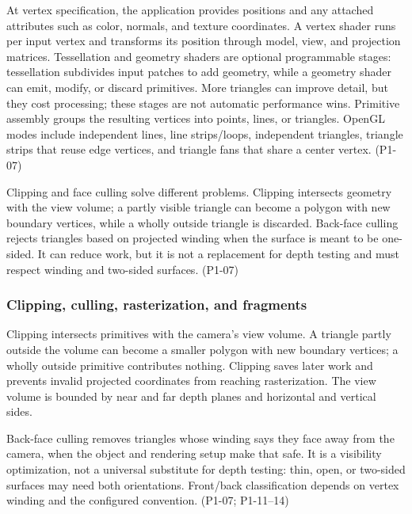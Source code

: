 At vertex specification, the application provides positions and any attached attributes such as color, normals, and texture coordinates. A vertex shader runs per input vertex and transforms its position through model, view, and projection matrices. Tessellation and geometry shaders are optional programmable stages: tessellation subdivides input patches to add geometry, while a geometry shader can emit, modify, or discard primitives. More triangles can improve detail, but they cost processing; these stages are not automatic performance wins. Primitive assembly groups the resulting vertices into points, lines, or triangles. OpenGL modes include independent lines, line strips/loops, independent triangles, triangle strips that reuse edge vertices, and triangle fans that share a center vertex. (P1-07)

Clipping and face culling solve different problems. Clipping intersects geometry with the view volume; a partly visible triangle can become a polygon with new boundary vertices, while a wholly outside triangle is discarded. Back-face culling rejects triangles based on projected winding when the surface is meant to be one-sided. It can reduce work, but it is not a replacement for depth testing and must respect winding and two-sided surfaces. (P1-07)

\subsubsection{Clipping, culling, rasterization, and fragments}\label{03-visual-computing-i-ch018-clipping-culling-rasterization-and-fragments}

\hypertarget{03-visual-computing-i-ch018-clipping-culling-rasterization-and-fragments}{}

Clipping intersects primitives with the camera's view volume. A triangle partly outside the volume can become a smaller polygon with new boundary vertices; a wholly outside primitive contributes nothing. Clipping saves later work and prevents invalid projected coordinates from reaching rasterization. The view volume is bounded by near and far depth planes and horizontal and vertical sides.

Back-face culling removes triangles whose winding says they face away from the camera, when the object and rendering setup make that safe. It is a visibility optimization, not a universal substitute for depth testing: thin, open, or two-sided surfaces may need both orientations. Front/back classification depends on vertex winding and the configured convention. (P1-07; P1-11--14)


